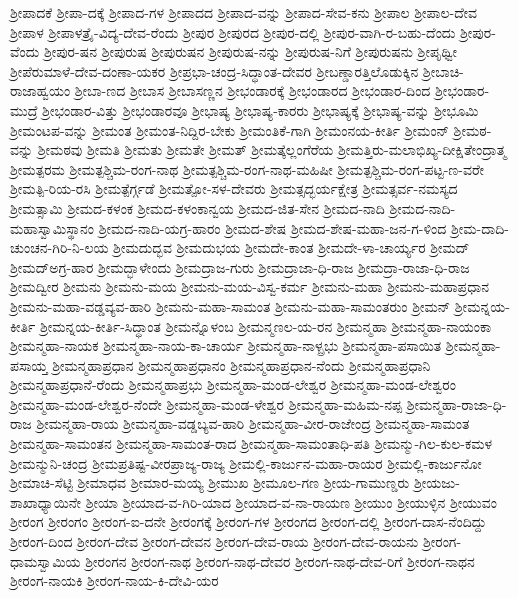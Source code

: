 ಶ್ರೀಪಾದಕೆ
ಶ್ರೀಪಾ-ದಕ್ಕೆ
ಶ್ರೀಪಾದ-ಗಳ
ಶ್ರೀಪಾದದ
ಶ್ರೀಪಾದ-ವನ್ನು
ಶ್ರೀಪಾದ-ಸೇವ-ಕನು
ಶ್ರೀಪಾಲ
ಶ್ರೀಪಾಲ-ದೇವ
ಶ್ರೀಪಾಳ
ಶ್ರೀಪಾಳತ್ರೈ-ವಿದ್ಯ-ದೇವ-ರೆಂದು
ಶ್ರೀಪುರ
ಶ್ರೀಪುರದ
ಶ್ರೀಪುರ-ದಲ್ಲಿ
ಶ್ರೀಪುರ-ವಾಗಿ-ರ-ಬಹು-ದೆಂದು
ಶ್ರೀಪುರ-ವೆಂದು
ಶ್ರೀಪುರ-ಷನ
ಶ್ರೀಪುರುಷ
ಶ್ರೀಪುರುಷನ
ಶ್ರೀಪುರುಷ-ನನ್ನು
ಶ್ರೀಪುರುಷ-ನಿಗೆ
ಶ್ರೀಪುರುಷನು
ಶ್ರೀಪೃಥ್ವೀ
ಶ್ರೀಪೆರುಮಾಳೆ-ದೇವ-ದಂಣಾ-ಯಕರ
ಶ್ರೀಪ್ರಭಾ-ಚಂದ್ರ-ಸಿದ್ಧಾಂತ-ದೇವರ
ಶ್ರೀಬಣ್ಡಾರತ್ತಿಲೊಡುಕ್ಕಿನ
ಶ್ರೀಬಾಚಿ-ರಾಜಾಹ್ವಯಂ
ಶ್ರೀಬಾ-ಣದ
ಶ್ರೀಬಾಸ
ಶ್ರೀಬಾಸಣ್ಣನ
ಶ್ರೀಭಂಡಾರಕ್ಕೆ
ಶ್ರೀಭಂಡಾರದ
ಶ್ರೀಭಂಡಾರ-ದಿಂದ
ಶ್ರೀಭಂಡಾರ-ಮುದ್ರೆ
ಶ್ರೀಭಂಡಾರ-ವಿತ್ತು
ಶ್ರೀಭಂಡಾರವೂ
ಶ್ರೀಭಾಷ್ಯ
ಶ್ರೀಭಾಷ್ಯ-ಕಾರರು
ಶ್ರೀಭಾಷ್ಯಕ್ಕೆ
ಶ್ರೀಭಾಷ್ಯ-ವನ್ನು
ಶ್ರೀಭೂಮಿ
ಶ್ರೀಮಂಟಪ-ವನ್ನು
ಶ್ರೀಮಂತ
ಶ್ರೀಮಂತ-ನಿದ್ದಿರ-ಬೇಕು
ಶ್ರೀಮಂತಿಕೆ-ಗಾಗಿ
ಶ್ರೀಮಂನಯ-ಕೀರ್ತಿ
ಶ್ರೀಮಂನ್
ಶ್ರೀಮಠ-ವನ್ನು
ಶ್ರೀಮಠವು
ಶ್ರೀಮತಿ
ಶ್ರೀಮತು
ಶ್ರೀಮತೇ
ಶ್ರೀಮತ್
ಶ್ರೀಮತ್ಕೆಲ್ಲಂಗೆರೆಯ
ಶ್ರೀಮತ್ತಿರು-ಮಲಾಭಿಖ್ಯ-ದೀಕ್ಷಿತೇಂದ್ರಾತ್ಮ
ಶ್ರೀಮತ್ಪರಮ
ಶ್ರೀಮತ್ಪಶ್ಚಿಮ-ರಂಗ-ನಾಥ
ಶ್ರೀಮತ್ಪಶ್ಚಿಮ-ರಂಗ-ನಾಥ-ಮಹಿಷೀ
ಶ್ರೀಮತ್ಪಶ್ಚಿಮ-ರಂಗ-ಪಟ್ಟ-ಣ-ವರೇ
ಶ್ರೀಮತ್ಪಿ-ರಿಯ-ರಸಿ
ಶ್ರೀಮತ್ಪೆರ್ಗ್ಗಡೆ
ಶ್ರೀಮತ್ಪೋ-ಸಳ-ದೇವರು
ಶ್ರೀಮತ್ಸದ್ಭರ್ಯಕ್ಷೇತ್ರ
ಶ್ರೀಮತ್ಸರ್ವ-ನಮಸ್ಯದ
ಶ್ರೀಮತ್ಸಾಮಿ
ಶ್ರೀಮದ-ಕಳಂಕ
ಶ್ರೀಮದ-ಕಳಂಕಾನ್ವಯ
ಶ್ರೀಮದ-ಜಿತ-ಸೇನ
ಶ್ರೀಮದ-ನಾದಿ
ಶ್ರೀಮದ-ನಾದಿ-ಮಹಾಸ್ವಾಮಿಸ್ಥಾನಂ
ಶ್ರೀಮದ-ನಾದಿ-ಯಗ್ರ-ಹಾರಂ
ಶ್ರೀಮದ-ಶೇಷ
ಶ್ರೀಮದ-ಶೇಷ-ಮಹಾ-ಜನ-ಗ-ಳಿಂದ
ಶ್ರೀಮ-ದಾದಿ-ಚುಂಚನ-ಗಿರಿ-ನಿ-ಲಯ
ಶ್ರೀಮದುದ್ಭವ
ಶ್ರೀಮದುಭಯ
ಶ್ರೀಮದೇ-ಕಾಂತ
ಶ್ರೀಮದೇ-ಳಾ-ಚಾರ್ಯ್ಯರ
ಶ್ರೀಮದ್
ಶ್ರೀಮದ್ಅಗ್ರ-ಹಾರ
ಶ್ರೀಮದ್ಭಾಳೇಂದು
ಶ್ರೀಮದ್ರಾಜ-ಗುರು
ಶ್ರೀಮದ್ರಾಜಾ-ಧಿ-ರಾಜ
ಶ್ರೀಮದ್ರಾ-ರಾಜಾ-ಧಿ-ರಾಜ
ಶ್ರೀಮದ್ವೀರ
ಶ್ರೀಮನು
ಶ್ರೀಮನು-ಮಯ
ಶ್ರೀಮನು-ಮಯ-ವಿಸ್ವ-ಕರ್ಮ
ಶ್ರೀಮನು-ಮಹಾ
ಶ್ರೀಮನು-ಮಹಾಪ್ರಧಾನ
ಶ್ರೀಮನು-ಮಹಾ-ವಡ್ಡವ್ಯವ-ಹಾರಿ
ಶ್ರೀಮನು-ಮಹಾ-ಸಾಮಂತ
ಶ್ರೀಮನು-ಮಹಾ-ಸಾಮಂತರುಂ
ಶ್ರೀಮನ್
ಶ್ರೀಮನ್ನಯ-ಕೀರ್ತಿ
ಶ್ರೀಮನ್ನಯ-ಕೀರ್ತಿ-ಸಿದ್ಧಾಂತ
ಶ್ರೀಮನ್ನೊಳಂಬ
ಶ್ರೀಮನ್ಮಣಲ-ಯ-ರನ
ಶ್ರೀಮನ್ಮಹಾ
ಶ್ರೀಮನ್ಮಹಾ-ನಾಯಂಕಾ
ಶ್ರೀಮನ್ಮಹಾ-ನಾಯಕ
ಶ್ರೀಮನ್ಮಹಾ-ನಾಯ-ಕಾ-ಚಾರ್ಯ
ಶ್ರೀಮನ್ಮಹಾ-ನಾಳ್ಪ್ರಭು
ಶ್ರೀಮನ್ಮಹಾ-ಪಸಾಯಿತ
ಶ್ರೀಮನ್ಮಹಾ-ಪಸಾಯ್ತ
ಶ್ರೀಮನ್ಮಹಾಪ್ರಧಾನ
ಶ್ರೀಮನ್ಮಹಾಪ್ರಧಾನಂ
ಶ್ರೀಮನ್ಮಹಾಪ್ರಧಾನ-ನೆಂದು
ಶ್ರೀಮನ್ಮಹಾಪ್ರಧಾನಿ
ಶ್ರೀಮನ್ಮಹಾಪ್ರಧಾನೆ-ರೆಂದು
ಶ್ರೀಮನ್ಮಹಾಪ್ರಭು
ಶ್ರೀಮನ್ಮಹಾ-ಮಂಡ-ಲೇಶ್ವರ
ಶ್ರೀಮನ್ಮಹಾ-ಮಂಡ-ಲೇಶ್ವರಂ
ಶ್ರೀಮನ್ಮಹಾ-ಮಂಡ-ಲೇಶ್ವರ-ನೆಂದೇ
ಶ್ರೀಮನ್ಮಹಾ-ಮಂಡ-ಳೇಶ್ವರ
ಶ್ರೀಮನ್ಮಹಾ-ಮಹಿಮ-ನಪ್ಪ
ಶ್ರೀಮನ್ಮಹಾ-ರಾಜಾ-ಧಿ-ರಾಜ
ಶ್ರೀಮನ್ಮಹಾ-ರಾಯ
ಶ್ರೀಮನ್ಮಹಾ-ವಡ್ಡಬ್ಯವ-ಹಾರಿ
ಶ್ರೀಮನ್ಮಹಾ-ವೀರ-ರಾಜೇಂದ್ರ
ಶ್ರೀಮನ್ಮಹಾ-ಸಾಮಂತ
ಶ್ರೀಮನ್ಮಹಾ-ಸಾಮಂತನ
ಶ್ರೀಮನ್ಮಹಾ-ಸಾಮಂತ-ರಾದ
ಶ್ರೀಮನ್ಮಹಾ-ಸಾಮಂತಾಧಿ-ಪತಿ
ಶ್ರೀಮನ್ಮು-ಗಿಲ-ಕುಲ-ಕಮಳ
ಶ್ರೀಮನ್ಮುನಿ-ಚಂದ್ರ
ಶ್ರೀಮಪ್ರತಿಷ್ಟ-ವೀರಪ್ರಾಜ್ಯ-ರಾಜ್ಯ
ಶ್ರೀಮಲ್ಲಿ-ಕಾರ್ಜುನ-ಮಹಾ-ರಾಯರ
ಶ್ರೀಮಲ್ಲಿ-ಕಾರ್ಜುನೋ
ಶ್ರೀಮಾಚಿ-ಸೆಟ್ಟಿ
ಶ್ರೀಮಾಧವ
ಶ್ರೀಮಾರ-ಮಯ್ಯ
ಶ್ರೀಮುಖ
ಶ್ರೀಮೂಲ-ಗಣ
ಶ್ರೀಯ-ಗಾಮುಣ್ಡರು
ಶ್ರೀಯಜು-ಶಾಖಾಧ್ಯಾಯಿನೇ
ಶ್ರೀಯಾ
ಶ್ರೀಯಾದ-ವ-ಗಿರಿ-ಯಾದ
ಶ್ರೀಯಾದ-ವ-ನಾ-ರಾಯಣ
ಶ್ರೀಯುಂ
ಶ್ರೀಯುಳ್ಳಿನ
ಶ್ರೀಯುವಂ
ಶ್ರೀರಂಗ
ಶ್ರೀರಂಗಂ
ಶ್ರೀರಂಗ-ಐ-ದನೇ
ಶ್ರೀರಂಗಕ್ಕೆ
ಶ್ರೀರಂಗ-ಗಳ
ಶ್ರೀರಂಗದ
ಶ್ರೀರಂಗ-ದಲ್ಲಿ
ಶ್ರೀರಂಗ-ದಾಸ-ನೆಂದಿದ್ದು
ಶ್ರೀರಂಗ-ದಿಂದ
ಶ್ರೀರಂಗ-ದೇವ
ಶ್ರೀರಂಗ-ದೇವನ
ಶ್ರೀರಂಗ-ದೇವ-ರಾಯ
ಶ್ರೀರಂಗ-ದೇವ-ರಾಯನು
ಶ್ರೀರಂಗ-ಧಾಮಸ್ವಾಮಿಯ
ಶ್ರೀರಂಗನ
ಶ್ರೀರಂಗ-ನಾಥ
ಶ್ರೀರಂಗ-ನಾಥ-ದೇವರ
ಶ್ರೀರಂಗ-ನಾಥ-ದೇವ-ರಿಗೆ
ಶ್ರೀರಂಗ-ನಾಥನ
ಶ್ರೀರಂಗ-ನಾಯಕಿ
ಶ್ರೀರಂಗ-ನಾಯ-ಕಿ-ದೇವಿ-ಯರ
